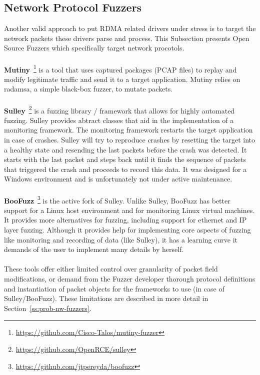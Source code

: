 \subsection{Network Protocol Fuzzers}\label{ss:network-fuzzers}

Another valid approach to put RDMA related drivers under stress is to target the network packets these drivers
parse and process. This Subsection presents Open Source Fuzzers which specifically target network procotols.

\paragraph{}\textbf{Mutiny}~\footnote{\url{https://github.com/Cisco-Talos/mutiny-fuzzer}}
is a tool that uses captured packages (PCAP files)
to replay and modify legitimate traffic and send it to a target
application. Mutiny relies on radamsa, a simple black-box fuzzer, to mutate packets.

\paragraph{}\textbf{Sulley}~\footnote{\url{https://github.com/OpenRCE/sulley}} is a fuzzing library / framework that allows for highly automated fuzzing.
Sulley provides abtract classes that aid in the implementation of a
monitoring framework. The monitoring framework restarts the target
application in case of crashes. Sulley will try to reproduce crashes
by resetting the target into a healthy state and resending the last packets
before the crash was detected. It starts with the last packet and steps
back until it finds the sequence of packets that triggered the crash and
proceeds to record this data. It was designed for a Windows environment and
is unfortunately not under active maintenance.

\paragraph{}\textbf{BooFuzz}~\footnote{\url{https://github.com/jtpereyda/boofuzz}} is the active fork of Sulley. Unlike Sulley, BooFuzz has better
support for a Linux host environment and for monitoring Linux virtual
machines. It provides more alternatives for fuzzing, including support for
ethernet and IP layer fuzzing. Although it provides help for implementing
core aspects of fuzzing like monitoring and recording of data (like
Sulley), it has a learning curve it demands of the user to
implement many details by herself.

\paragraph{}
These tools offer either limited control over granularity of packet field
modifications, or demand from the Fuzzer developer thorough protocol
definitions and instantiation of packet objects for the frameworks to
use (in case of Sulley/BooFuzz). These limitations are described in
more detail in Section~\ref{ss:prob-nw-fuzzers}.
